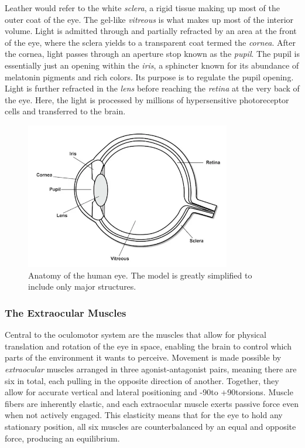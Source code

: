 Leather would refer to the white \textit{sclera}, a rigid tissue making up most of the outer coat of the eye. The gel-like \textit{vitreous} is what makes up most of the interior volume. Light is admitted through and partially refracted by an area at the front of the eye, where the sclera yields to a transparent coat termed the \textit{cornea}. After the cornea, light passes through an aperture stop known as the \textit{pupil}. The pupil is essentially just an opening within the \textit{iris}, a sphincter known for its abundance of melatonin pigments and rich colors. Its purpose is to regulate the pupil opening. Light is further refracted in the \textit{lens} before reaching the \textit{retina} at the very back of the eye. Here, the light is processed by millions of hypersensitive photoreceptor cells and transferred to the brain. 

\begin{figure}[h]
    \centering
    \includegraphics[width=0.8\textwidth]{Images/bt_eye.png}
    \caption{Anatomy of the human eye. The model is greatly simplified to include only major structures.}
    \label{fig:bt_eye}
\end{figure}

\subsubsection{The Extraocular Muscles}

Central to the oculomotor system are the muscles that allow for physical translation and rotation of the eye in space, enabling the brain to control which parts of the environment it wants to perceive. Movement is made possible by \textit{extraocular} muscles arranged in three agonist-antagonist pairs, meaning there are six in total, each pulling in the opposite direction of another. Together, they allow for accurate vertical and lateral positioning and -90\degree to +90\degree torsions. Muscle fibers are inherently elastic, and each extraocular muscle exerts passive force even when not actively engaged. This elasticity means that for the eye to hold any stationary position, all six muscles are counterbalanced by an equal and opposite force, producing an equilibrium.

